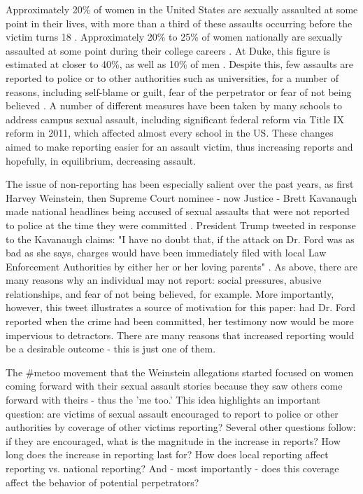 \documentclass[AER,draftmode]{AEA}
\begin{document}

\clearpage
Approximately 20\% of women in the United States are sexually assaulted at some point in their lives, with more than a third of these assaults occurring before the victim turns 18 \cite{black_national_2011}. Approximately 20\% to 25\% of women nationally are sexually assaulted at some point during their college careers \cite{fisher_sexual_2000}. At Duke, this figure is estimated at closer to 40\%, as well as 10\% of men \cite{fox_university_2017} . Despite this, few assaults are reported to police or to other authorities such as universities, for a number of reasons, including self-blame or guilt, fear of the perpetrator or fear of not being believed \cite{du_mont_role_2003}. A number of different measures have been taken by many schools to address campus sexual assault, including significant federal reform via Title IX reform in 2011, which affected almost every school in the US. These changes aimed to make reporting easier for an assault victim, thus increasing reports and hopefully, in equilibrium, decreasing assault.

The issue of non-reporting has been especially salient over the past years, as first Harvey Weinstein, then Supreme Court nominee - now Justice - Brett Kavanaugh made national headlines being accused of sexual assaults that were not reported to police at the time they were committed . President Trump tweeted in response to the Kavanaugh claims: "I have no doubt that, if the attack on Dr. Ford was as bad as she says, charges would have been immediately filed with local Law Enforcement Authorities by either her or her loving parents" \citeyear{trump_i_2018}. As above, there are many reasons why an individual may not report: social pressures, abusive relationships, and fear of not being believed, for example. More importantly, however, this tweet illustrates a source of motivation for this paper: had Dr. Ford reported when the crime had been committed, her testimony now would be more impervious to detractors. There are many reasons that increased reporting would be a desirable outcome - this is just one of them. 

The #metoo movement that the Weinstein allegations started focused on women coming forward with their sexual assault stories because they saw others come forward with theirs - thus the 'me too.' This idea highlights an important question: are victims of sexual assault encouraged to report to police or other authorities by coverage of other victims reporting? Several other questions follow: if they are encouraged, what is the magnitude in the increase in reports? How long does the increase in reporting last for? How does local reporting affect reporting vs. national reporting? And - most importantly - does this coverage affect the behavior of potential perpetrators?
\end{document}
